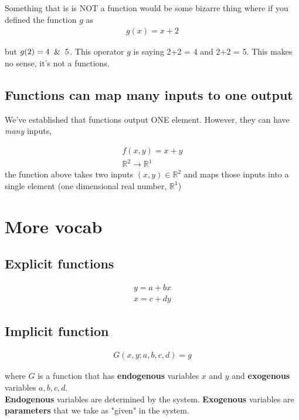 \documentclass[12pt]{article}
\begin{document}
Something that is is NOT a function would be some bizarre thing where if you defined the function $g$ as 
\begin{align*}
    g(x) = x+2
\end{align*}

but $g(2) = 4 \And 5$. This operator $g$ is saying 2+2 = 4 and 2+2 = 5. This makes no sense, it's not a functions. \\

\subsection{Functions can map many inputs to one output}

We've established that functions output ONE element. However, they can have \textit{many} inputs, 

\begin{align*}
    f(x,y) = x + y\\
    \mathbb{R}^2 \rightarrow \mathbb{R}^1
\end{align*}
the function above takes two inputs $(x,y) \in \mathbb{R}^2$ and maps those inputs into a single element (one dimensional real number, $\mathbb{R}^1$)

\section{More vocab}
\subsection{Explicit functions}
\begin{align*}
    y = a + b x\\
    x = c + dy
\end{align*}

\subsection{Implicit function}
\begin{align*}
    G(x, y; a, b, c, d) = g
\end{align*}

where $G$ is a function that has \textbf{endogenous} variables $x$ and $y$ and \textbf{exogenous} variables $a, b, c, d$. \\

\textbf{Endogenous} variables are determined by the system. \textbf{Exogenous} variables are \textbf{parameters} that we take as "given" in the system. 
\end{document}

